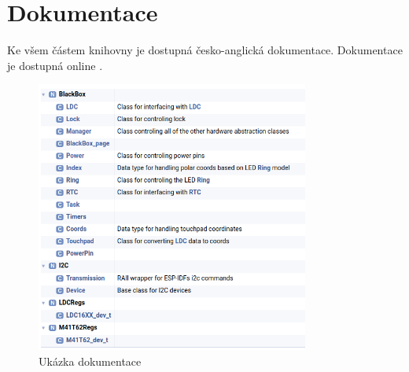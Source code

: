\chapter{Dokumentace}

Ke všem částem knihovny je dostupná česko-anglická dokumentace.
\enlargethispage{50mm}
Dokumentace je dostupná online \cite{dokumentace}.

\begin{figure}[H]
    \begin{small}
        \begin{center}
            \includegraphics[width=0.8\textwidth]{img/doku.png}
        \end{center}
        \caption{Ukázka dokumentace}
        \label{fig:doku}
    \end{small}
\end{figure}
